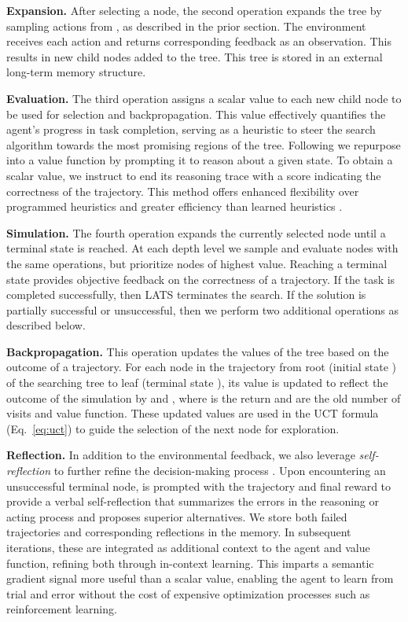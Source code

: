 \documentclass{article} \usepackage{iclr2024_conference,times}
\begin{document}
\textbf{Expansion.} 
After selecting a node, the second operation expands the tree by sampling  actions from , as described in the prior section. The environment receives each action and returns corresponding feedback as an observation. This results in  new child nodes added to the tree. This tree is stored in an external long-term memory structure.

\textbf{Evaluation.} 
The third operation assigns a scalar value to each new child node to be used for selection and backpropagation. This value effectively quantifies the agent's progress in task completion, serving as a heuristic to steer the search algorithm towards the most promising regions of the tree. Following \citet{yao2023tree} we repurpose  into a value function by prompting it to reason about a given state. To obtain a scalar value, we instruct  to end its reasoning trace with a score indicating the correctness of the trajectory. This method offers enhanced flexibility over programmed heuristics \citep{campbell2002deep} and greater efficiency than learned heuristics \citep{Silver2017MasteringTG}.

\textbf{Simulation.} The fourth operation expands the currently selected node until a terminal state is reached. At each depth level we sample and evaluate nodes with the same operations, but prioritize nodes of highest value. Reaching a terminal state provides objective feedback on the correctness of a trajectory. If the task is completed successfully, then LATS terminates the search. If the solution is partially successful or unsuccessful, then we perform two additional operations as described below.

\textbf{Backpropagation.} 
This operation updates the values of the tree based on the outcome of a trajectory. For each node  in the trajectory from root (initial state ) of the searching tree to leaf (terminal state ), its value is updated to reflect the outcome of the simulation by  and , where  is the return and  are the old number of visits and value function. These updated values are used in the UCT formula (Eq.~\ref{eq:uct}) to guide the selection of the next node for exploration.

\textbf{Reflection.}
In addition to the environmental feedback, we also leverage \textit{self-reflection} to further refine the decision-making process \citep{shinn2023reflexion, madaan2023selfrefine}. Upon encountering an unsuccessful terminal node,  is prompted with the trajectory and final reward to provide a verbal self-reflection that summarizes the errors in the reasoning or acting process and proposes superior alternatives. We store both failed trajectories and corresponding reflections in the memory. In subsequent iterations, these are integrated as additional context to the agent and value function, refining both through in-context learning. This imparts a semantic gradient signal more useful than a scalar value, enabling the agent to learn from trial and error without the cost of expensive optimization processes such as reinforcement learning.
\end{document}
